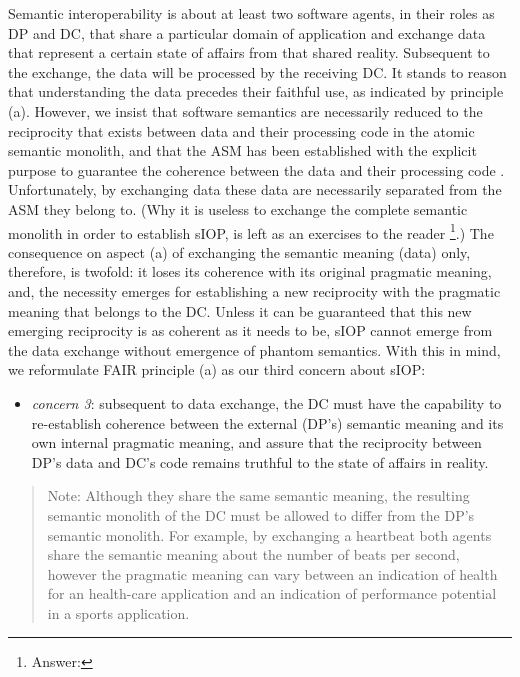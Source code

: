 \documentclass[sort&compress,preprint,authoryear,3p,twocolumn]{elsarticle}
\providecommand{\tightlist}{%
  \setlength{\itemsep}{0pt}\setlength{\parskip}{0pt}}
\begin{document}
Semantic interoperability is about at least two software agents, in
their roles as DP and DC, that share a particular domain of application
and exchange data that represent a certain state of affairs from that
shared reality. Subsequent to the exchange, the data will be processed
by the receiving DC. It stands to reason that understanding the data
precedes their faithful use, as indicated by principle (a). However, we
insist that software semantics are necessarily reduced to the
reciprocity that exists between data and their processing code in the
atomic semantic monolith, and that the ASM has been established with the
explicit purpose to guarantee the coherence between the data and their
processing code \citep{Brandt2021a}. Unfortunately, by exchanging data
these data are necessarily separated from the ASM they belong to. (Why
it is useless to exchange the complete semantic monolith in order to
establish sIOP, is left as an exercises to the reader \footnote{Answer:
  }.)
The consequence on aspect (a) of exchanging the semantic meaning (data)
only, therefore, is twofold: it loses its coherence with its original
pragmatic meaning, and, the necessity emerges for establishing a new
reciprocity with the pragmatic meaning that belongs to the DC. Unless it
can be guaranteed that this new emerging reciprocity is as coherent as
it needs to be, sIOP cannot emerge from the data exchange without
emergence of phantom semantics. With this in mind, we reformulate FAIR
principle (a) as our third concern about sIOP:

\begin{itemize}
\tightlist
\item
  \emph{concern 3}: subsequent to data exchange, the DC must have the
  capability to re-establish coherence between the external (DP's)
  semantic meaning and its own internal pragmatic meaning, and assure
  that the reciprocity between DP's data and DC's code remains truthful
  to the state of affairs in reality.
\end{itemize}

\begin{quote}
Note: Although they share the same semantic meaning, the resulting
semantic monolith of the DC must be allowed to differ from the DP's
semantic monolith. For example, by exchanging a heartbeat both agents
share the semantic meaning about the number of beats per second, however
the pragmatic meaning can vary between an indication of health for an
health-care application and an indication of performance potential in a
sports application.
\end{quote}
\end{document}
